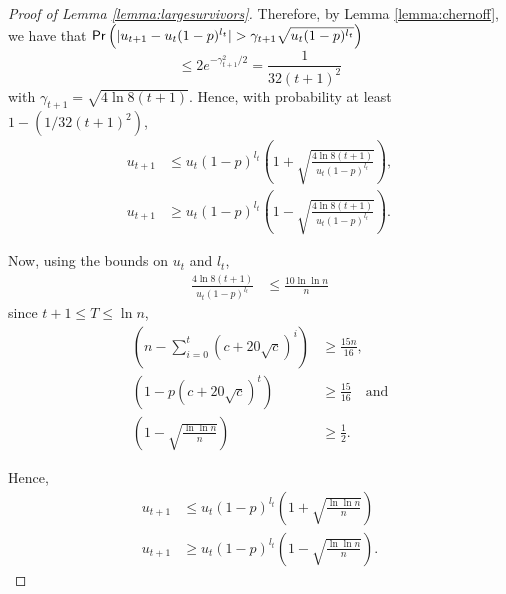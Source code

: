 \documentclass[11pt]{article}
\newcommand{\prob}[1]{{\sf Pr}\left(#1\right)}
\begin{document}
\begin{proof}[Proof of Lemma \ref{lemma:largesurvivors}]
Therefore, by Lemma \ref{lemma:chernoff}, we have that
$\prob{|u_{t+1}-u_t(1-p)^{l_t}|>\gamma_{t+1}\sqrt{u_t(1-p)^{l_t}}}$
\[
\leq 2e^{-\gamma_{t+1}^2/2}=\frac{1}{32(t+1)^2}
\]
with $\gamma_{t+1}=\sqrt{4\ln{8(t+1)}}$. Hence, with probability at least $1-(1/32(t+1)^2)$,
\begin{align*}
u_{t+1} &\leq u_t(1-p)^{l_t}\left(1+\sqrt{\frac{4\ln{8(t+1)}}{u_t(1-p)^{l_t}}}\right),\\
u_{t+1} &\geq u_t(1-p)^{l_t}\left(1-\sqrt{\frac{4\ln{8(t+1)}}{u_t(1-p)^{l_t}}}\right).
\end{align*}

Now, using the bounds on $u_t$ and $l_t$, \begin{align*}
\frac{4\ln{8(t+1)}}{u_t(1-p)^{l_t}} & \leq \frac{10\ln{\ln{n}}}{n}
\end{align*}
since $t+1\leq T\leq \ln{n}$,
\begin{align*}
(n-\sum_{i=0}^t (c+20\sqrt{c})^i) &\geq \frac{15n}{16},\\
(1-p(c+20\sqrt{c})^t) &\geq \frac{15}{16} \quad \text{and}\\
\left(1-\sqrt{\frac{\ln{\ln{n}}}{n}}\right) &\geq \frac{1}{2}.
\end{align*}

Hence, \begin{align}
u_{t+1} &\leq u_t(1-p)^{l_t}\left(1+\sqrt{\frac{\ln{\ln{n}}}{n}}\right) \label{ineq:u-upperbound}\\
u_{t+1} &\geq u_t(1-p)^{l_t}\left(1-\sqrt{\frac{\ln{\ln{n}}}{n}}\right) \label{ineq:u-lowerbound}.
\end{align}


\end{proof}
\end{document}
